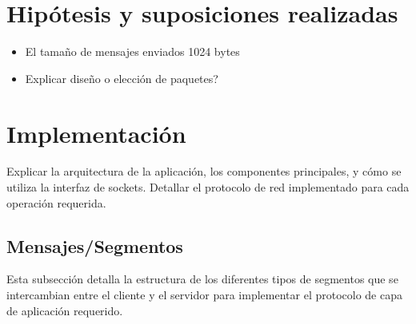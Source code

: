 \documentclass[a4paper,10pt]{article}
\begin{document}
\section{Hipótesis y suposiciones realizadas}
\begin{itemize}
    \item El tamaño de mensajes enviados 1024 bytes
    
    \item Explicar diseño o elección de paquetes?
\end{itemize}

\section{Implementación}
Explicar la arquitectura de la aplicación, los componentes principales, y cómo se utiliza la interfaz de sockets. Detallar el protocolo de red implementado para cada operación requerida.

\subsection{Mensajes/Segmentos}
Esta subsección detalla la estructura de los diferentes tipos de segmentos que se intercambian entre el cliente y el servidor para implementar el protocolo de capa de aplicación requerido.
\end{document}
